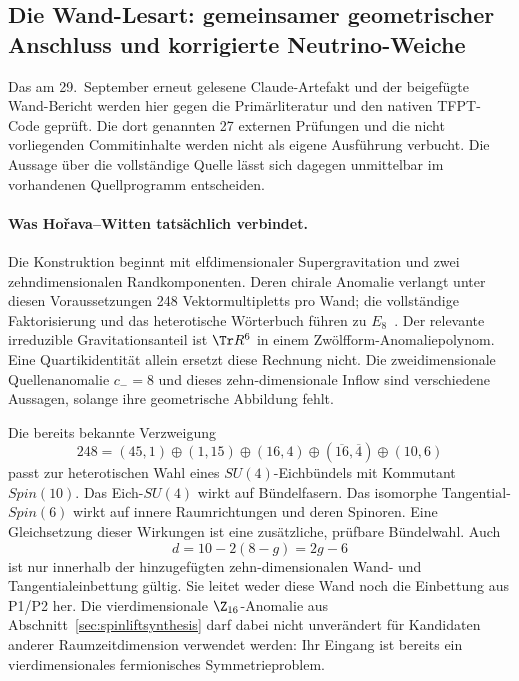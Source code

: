 \subsection{Die Wand-Lesart: gemeinsamer geometrischer Anschluss und korrigierte Neutrino-Weiche}\label{sec:wallaudit}

Das am 29.~September erneut gelesene Claude-Artefakt und der beigefügte Wand-Bericht werden hier gegen die Primärliteratur und den nativen TFPT-Code geprüft. Die dort genannten 27 externen Prüfungen und die nicht vorliegenden Commitinhalte werden nicht als eigene Ausführung verbucht. Die Aussage über die vollständige Quelle lässt sich dagegen unmittelbar im vorhandenen Quellprogramm entscheiden.

\paragraph{Was Hořava--Witten tatsächlich verbindet.}
Die Konstruktion beginnt mit elfdimensionaler Supergravitation und zwei zehndimensionalen Randkomponenten. Deren chirale Anomalie verlangt unter diesen Voraussetzungen 248 Vektormultipletts pro Wand; die vollständige Faktorisierung und das heterotische Wörterbuch führen zu $E_8$~\cite{horavawittenorigin,horavawittenwall}. Der relevante irreduzible Gravitationsanteil ist $\Tr R^6$ in einem Zwölfform-Anomaliepolynom. Eine Quartikidentität allein ersetzt diese Rechnung nicht. Die zweidimensionale Quellenanomalie $c_-=8$ und dieses zehn-dimensionale Inflow sind verschiedene Aussagen, solange ihre geometrische Abbildung fehlt.

Die bereits bekannte Verzweigung
\begin{equation}
248=(45,1)\oplus(1,15)\oplus(16,4)
\oplus(\overline{16},\overline4)\oplus(10,6)
\end{equation}
passt zur heterotischen Wahl eines $SU(4)$-Eichbündels mit Kommutant $Spin(10)$. Das Eich-$SU(4)$ wirkt auf Bündelfasern. Das isomorphe Tangential-$Spin(6)$ wirkt auf innere Raumrichtungen und deren Spinoren. Eine Gleichsetzung dieser Wirkungen ist eine zusätzliche, prüfbare Bündelwahl. Auch
\begin{equation}
d=10-2(8-g)=2g-6
\end{equation}
ist nur innerhalb der hinzugefügten zehn-dimensionalen Wand- und Tangentialeinbettung gültig. Sie leitet weder diese Wand noch die Einbettung aus P1/P2 her. Die vierdimensionale $\Z_{16}$-Anomalie aus Abschnitt~\ref{sec:spinliftsynthesis} darf dabei nicht unverändert für Kandidaten anderer Raumzeitdimension verwendet werden: Ihr Eingang ist bereits ein vierdimensionales fermionisches Symmetrieproblem.


